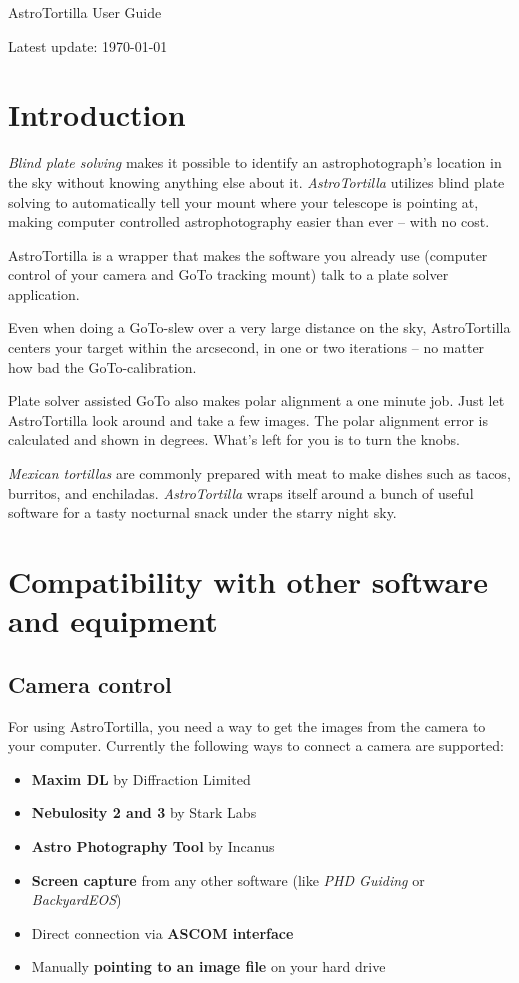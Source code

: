 \documentclass[english]{article}
\begin{document}
\centerline{\sf \Huge AstroTortilla User Guide}
\centerline{Latest update: \today}

\tableofcontents

\setlength{\parindent}{0pt}
\setlength{\parskip}{2ex}


\newpage

\section{Introduction}

\emph{Blind plate solving} makes it possible to identify an astrophotograph's location in the sky without knowing anything else about it. \emph{AstroTortilla} utilizes blind plate solving to automatically tell your mount where your telescope is pointing at, making computer controlled astrophotography easier than ever -- with no cost.

AstroTortilla is a wrapper that makes the software you already use (computer control of your camera and GoTo tracking mount) talk to a plate solver application.

Even when doing a GoTo-slew over a very large distance on the sky, AstroTortilla centers your target within the arcsecond, in one or two iterations -- no matter how bad the GoTo-calibration.

Plate solver assisted GoTo also makes polar alignment a one minute job. Just let AstroTortilla look around and take a few images. The polar alignment error is calculated and shown in degrees. What's left for you is to turn the knobs.

\emph{Mexican tortillas} are commonly prepared with meat to make dishes such as
tacos, burritos, and enchiladas. \emph{AstroTortilla} wraps itself around a
bunch of useful software for a tasty nocturnal snack under the starry night
sky.


\section{Compatibility with other software and equipment} 

\subsection{Camera control}

For using AstroTortilla, you need a way to get the images from the camera to your computer. Currently the following ways to connect a camera are supported:
\begin{itemize}
\item \textbf{Maxim DL} by Diffraction Limited
\item \textbf{Nebulosity 2 and 3} by Stark Labs
\item \textbf{Astro Photography Tool} by Incanus
\item \textbf{Screen capture} from any other software (like \emph{PHD Guiding} or \emph{BackyardEOS})
\item Direct connection via \textbf{ASCOM interface}
\item Manually \textbf{pointing to an image file} on your hard drive
\end{itemize}
\end{document}
